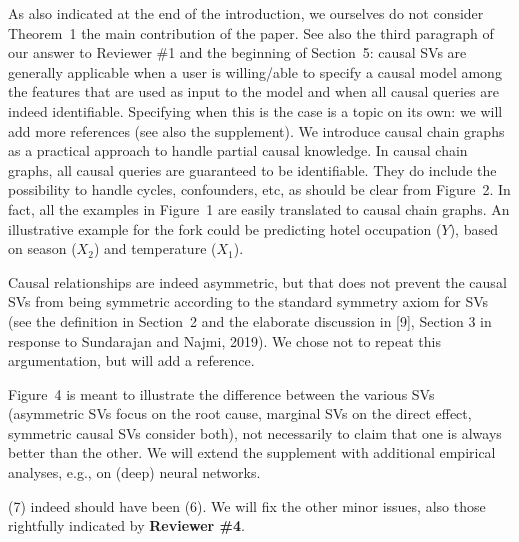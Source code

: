 \documentclass{article}
\begin{document}
As also indicated at the end of the introduction, we ourselves do not consider Theorem~1 the main contribution of the paper. See also the third paragraph of our answer to Reviewer \#1 and the beginning of Section~5: causal SVs are generally applicable when a user is willing/able to specify a causal model among the features that are used as input to the model and when all causal queries are indeed identifiable. Specifying when this is the case is a topic on its own: we will add more references (see also the supplement). We introduce causal chain graphs as a practical approach to handle partial causal knowledge. In causal chain graphs, all causal queries are guaranteed to be identifiable. They do include the possibility to handle cycles, confounders, etc, as should be clear from Figure~2. In fact, all the examples in Figure~1 are easily translated to causal chain graphs. An illustrative example for the fork could be predicting hotel occupation ($Y$), based on season ($X_2$) and temperature ($X_1$).

Causal relationships are indeed asymmetric, but that does not prevent the causal SVs from being symmetric according to the standard symmetry axiom for SVs (see the definition in Section~2 and the elaborate discussion in [9], Section 3 in response to Sundarajan and Najmi, 2019). We chose not to repeat this argumentation, but will add a reference.

Figure~4 is meant to illustrate the difference between the various SVs (asymmetric SVs focus on the root cause, marginal SVs on the direct effect, symmetric causal SVs consider both), not necessarily to claim that one is always better than the other. We will extend the supplement with additional empirical analyses, e.g., on (deep) neural networks.

(7) indeed should have been (6). We will fix the other minor issues, also those rightfully indicated by {\bf Reviewer \#4}.
\end{document}
